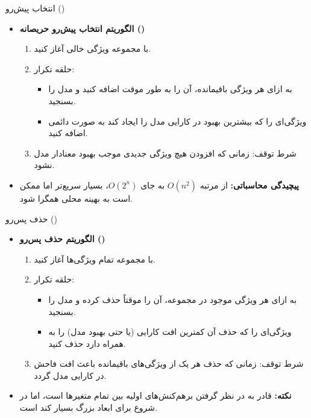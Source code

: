 \begin{frame}{انتخاب پیش‌رو ()}
\begin{itemize}
  \item \textbf{الگوریتم انتخاب پیش‌رو حریصانه ()}
  \begin{enumerate}
    \item با مجموعه ویژگی خالی آغاز کنید.
    \item حلقه تکرار:
    \begin{itemize}
      \item به ازای هر ویژگی باقیمانده، آن را به طور موقت اضافه کنید و مدل را بسنجید.
      \item ویژگی‌ای را که بیشترین بهبود در کارایی مدل را ایجاد کند به صورت دائمی اضافه کنید.
    \end{itemize}
    \item شرط توقف: زمانی که افزودن هیچ ویژگی جدیدی موجب بهبود معنادار مدل نشود.
  \end{enumerate}
  \vspace{0.3cm}
  \item \textbf{پیچیدگی محاسباتی:} از مرتبه $O(n^2)$ به جای $O(2^n)$، بسیار سریع‌تر اما ممکن است به بهینه محلی همگرا شود.
\end{itemize}
\end{frame}

\begin{frame}{حذف پس‌رو ()}
\begin{itemize}
  \item \textbf{الگوریتم حذف پس‌رو ()}
  \begin{enumerate}
    \item با مجموعه تمام ویژگی‌ها آغاز کنید.
    \item حلقه تکرار:
    \begin{itemize}
      \item به ازای هر ویژگی موجود در مجموعه، آن را موقتاً حذف کرده و مدل را بسنجید.
      \item ویژگی‌ای را که حذف آن کمترین افت کارایی (یا حتی بهبود مدل) را به همراه دارد حذف کنید.
    \end{itemize}
    \item شرط توقف: زمانی که حذف هر یک از ویژگی‌های باقیمانده باعث افت فاحش در کارایی مدل گردد.
  \end{enumerate}
  \vspace{0.3cm}
  \item \textbf{نکته:} قادر به در نظر گرفتن برهم‌کنش‌های اولیه بین تمام متغیرها است، اما در شروع برای ابعاد بزرگ بسیار کند است.
\end{itemize}
\end{frame}

